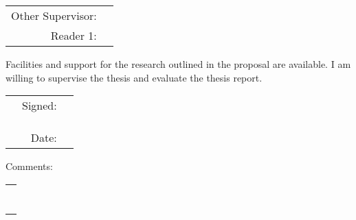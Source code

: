 \vspace{.25in}
\begin{tabular}{rl}
	{\small \sc Other Supervisor:} & \supervisor
	\\ {\small \sc Reader 1:} & \readertwo
\end{tabular}

\vspace{.25in}
Facilities and support for the research outlined in the proposal are available.
I am willing to supervise the thesis and evaluate the thesis report.

\vspace{.25in}
\begin{tabular}{crc}
	\hspace{2in} & {\sc Signed:} & \\ \cline{3-3}
	&               & {\small \sc \supervisortwotitleone} \\
	&               & {\small \sc \supervisortwotitletwo} \\
	&               &                             \\
	& {\sc Date:}   & \\ \cline{3-3}
\end{tabular}

\vspace{0in plus 1fill}

Comments: \\
\begin{tabular}{c}
	\hspace{6.25in} \\
	\mbox{} \\ \cline{1-1} \mbox{} \\
	\mbox{} \\ \cline{1-1} \mbox{} \\
	\mbox{} \\ \cline{1-1} \mbox{} \\
\end{tabular}

\newpage  %


